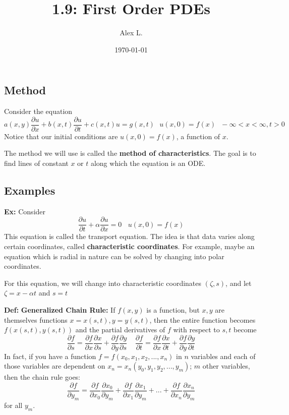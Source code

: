 \documentclass{article}
\title{1.9: First Order PDEs}
\author{Alex L.}
\date{\today}
\begin{document}
\maketitle

\subsection{Method}

Consider the equation $$a(x,y)\frac{\partial u}{\partial x} + b(x,t)\frac{\partial u}{\partial t} + c(x,t)u = g(x,t) \ \ \ u(x,0) = f(x) \ \ \ -\infty < x < \infty, t > 0$$Notice that our initial conditions are $u(x,0) = f(x)$, a function of $x$. 

The method we will use is called the \textbf{method of characteristics}. The goal is to find lines of constant $x$ or $t$ along which the equation is an ODE. 

\subsection{Examples}

\textbf{Ex:} Consider $$\frac{\partial u}{\partial t} + \alpha\frac{\partial u}{\partial x} = 0 \ \ \ \ u(x,0) = f(x)$$This equation is called the transport equation. The idea is that data varies along certain coordinates, called \textbf{characteristic coordinates}. For example, maybe an equation which is radial in nature can be solved by changing into polar coordinates. 

For this equation, we will change into characteristic coordinates $(\zeta, s)$, and let $\zeta = x- \alpha t$ and $s = t$

\textbf{Def:} \textbf{Generalized Chain Rule:} If $f(x,y)$ is a function, but $x,y$ are themselves functions $x = x(s,t), y = y(s,t)$, then the entire function becomes $f(x(s,t),y(s,t))$ and the partial derivatives of $f$ with respect to $s, t$ become $$\frac{\partial f}{\partial s} = \frac{\partial f}{\partial x} \frac{\partial x}{\partial s} + \frac{\partial f}{\partial y} \frac{\partial y}{\partial s} \ \ \ \ \ \frac{\partial f}{\partial t} = \frac{\partial f}{\partial x} \frac{\partial x}{\partial t} + \frac{\partial f}{\partial y} \frac{\partial y}{\partial t}$$
In fact, if you have a function $f = f(x_0,x_1,x_2,...,x_n)$ in $n$ variables and each of those variables are dependent on $x_n = x_n(y_0,y_1,y_2,...,y_m)$; $m$ other variables, then the chain rule goes: $$\frac{\partial f}{\partial y_m} = \frac{\partial f}{\partial x_0} \frac{\partial x_0}{\partial y_m} + \frac{\partial f}{\partial x_1} \frac{\partial x_1}{\partial y_m} + ... + \frac{\partial f}{\partial x_n} \frac{\partial x_n}{\partial y_m}$$for all $y_m$.
\end{document}
